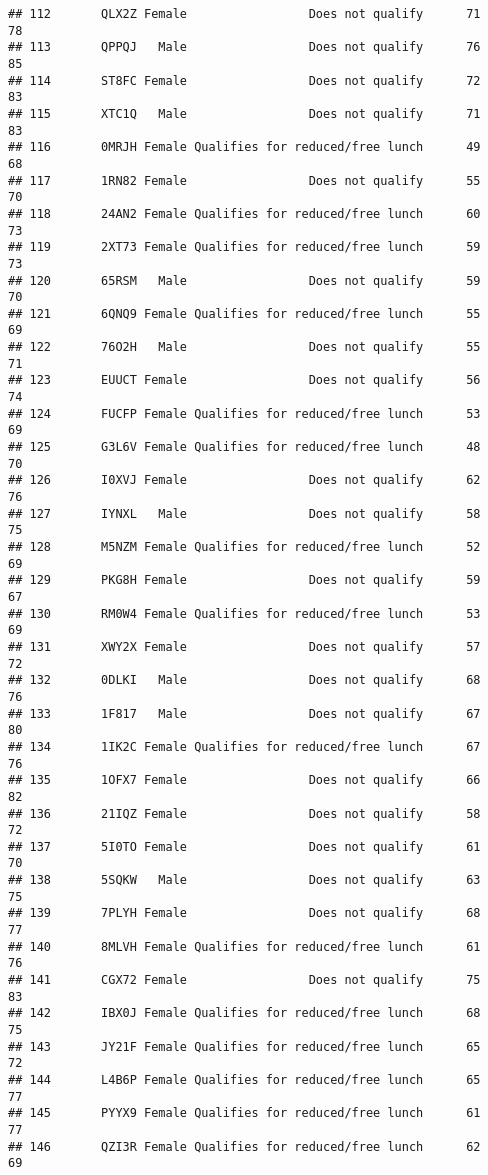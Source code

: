 \documentclass[
]{article}
\begin{document}
\begin{verbatim}
## 112       QLX2Z Female                 Does not qualify      71       78
## 113       QPPQJ   Male                 Does not qualify      76       85
## 114       ST8FC Female                 Does not qualify      72       83
## 115       XTC1Q   Male                 Does not qualify      71       83
## 116       0MRJH Female Qualifies for reduced/free lunch      49       68
## 117       1RN82 Female                 Does not qualify      55       70
## 118       24AN2 Female Qualifies for reduced/free lunch      60       73
## 119       2XT73 Female Qualifies for reduced/free lunch      59       73
## 120       65RSM   Male                 Does not qualify      59       70
## 121       6QNQ9 Female Qualifies for reduced/free lunch      55       69
## 122       76O2H   Male                 Does not qualify      55       71
## 123       EUUCT Female                 Does not qualify      56       74
## 124       FUCFP Female Qualifies for reduced/free lunch      53       69
## 125       G3L6V Female Qualifies for reduced/free lunch      48       70
## 126       I0XVJ Female                 Does not qualify      62       76
## 127       IYNXL   Male                 Does not qualify      58       75
## 128       M5NZM Female Qualifies for reduced/free lunch      52       69
## 129       PKG8H Female                 Does not qualify      59       67
## 130       RM0W4 Female Qualifies for reduced/free lunch      53       69
## 131       XWY2X Female                 Does not qualify      57       72
## 132       0DLKI   Male                 Does not qualify      68       76
## 133       1F817   Male                 Does not qualify      67       80
## 134       1IK2C Female Qualifies for reduced/free lunch      67       76
## 135       1OFX7 Female                 Does not qualify      66       82
## 136       21IQZ Female                 Does not qualify      58       72
## 137       5I0TO Female                 Does not qualify      61       70
## 138       5SQKW   Male                 Does not qualify      63       75
## 139       7PLYH Female                 Does not qualify      68       77
## 140       8MLVH Female Qualifies for reduced/free lunch      61       76
## 141       CGX72 Female                 Does not qualify      75       83
## 142       IBX0J Female Qualifies for reduced/free lunch      68       75
## 143       JY21F Female Qualifies for reduced/free lunch      65       72
## 144       L4B6P Female Qualifies for reduced/free lunch      65       77
## 145       PYYX9 Female Qualifies for reduced/free lunch      61       77
## 146       QZI3R Female Qualifies for reduced/free lunch      62       69

\end{verbatim}
\end{document}
